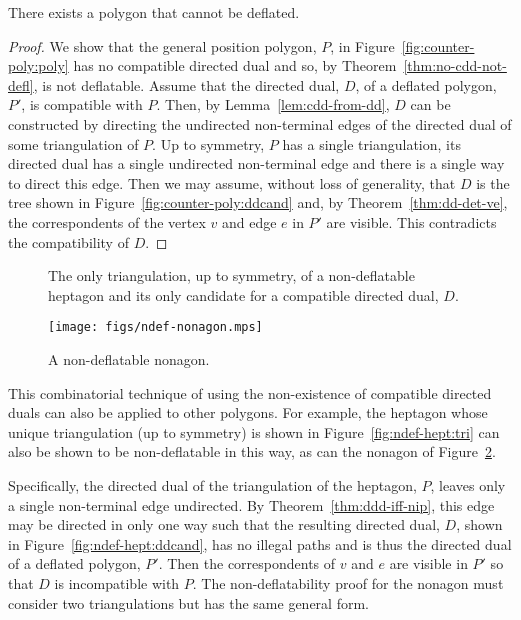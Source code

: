 \documentclass[11pt]{amsart}
\begin{document}
\begin{theorem}
  There exists a polygon that cannot be deflated.
\end{theorem}
\begin{proof}
  We show that the general position polygon, $P$, in
  Figure~\ref{fig:counter-poly:poly} has no compatible directed dual
  and so, by Theorem~\ref{thm:no-cdd-not-defl}, is not deflatable.
  Assume that the directed dual, $D$, of a deflated polygon, $P'$, is
  compatible with $P$.  Then, by Lemma~\ref{lem:cdd-from-dd}, $D$ can
  be constructed by directing the undirected non-terminal edges of the
  directed dual of some triangulation of $P$.  Up to symmetry, $P$ has
  a single triangulation, its directed dual has a single undirected
  non-terminal edge and there is a single way to direct this edge.
  Then we may assume, without loss of generality, that $D$ is the tree
  shown in Figure~\ref{fig:counter-poly:ddcand} and, by
  Theorem~\ref{thm:dd-det-ve}, the correspondents of the vertex $v$
  and edge $e$ in $P'$ are visible.  This contradicts the
  compatibility of $D$.
\end{proof}


\begin{figure}[htb]
  \centering
  \quad
  \caption{\protect{} The only triangulation,
    up to symmetry, of a non-deflatable heptagon
    and \protect{} its only candidate for a
    compatible directed dual, $D$.}
  \label{fig:ndef-hept}
\end{figure}

\begin{figure}[htb]
  \centering
  \texttt{[image: figs/ndef-nonagon.mps]}
  \caption{A non-deflatable nonagon.}
  \label{fig:ndef-non}
\end{figure}

This combinatorial technique of using the non-existence of compatible
directed duals can also be applied to other polygons.  For example,
the heptagon whose unique triangulation (up to symmetry) is shown in
Figure~\ref{fig:ndef-hept:tri} can also be shown to be non-deflatable
in this way, as can the nonagon of Figure~\ref{fig:ndef-non}.

Specifically, the directed dual of the triangulation of the heptagon,
$P$, leaves only a single non-terminal edge undirected.  By
Theorem~\ref{thm:ddd-iff-nip}, this edge may be directed in only one
way such that the resulting directed dual, $D$, shown in
Figure~\ref{fig:ndef-hept:ddcand}, has no illegal paths and is thus
the directed dual of a deflated polygon, $P'$.  Then the
correspondents of $v$ and $e$ are visible in $P'$ so that $D$ is
incompatible with $P$.  The non-deflatability proof for the nonagon
must consider two triangulations but has the same general form.
\end{document}
